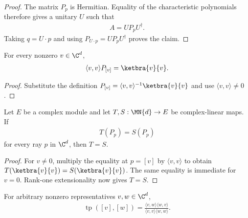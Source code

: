 \begin{proof}\leanok
    The matrix $P_p$ is Hermitian. Equality of the characteristic polynomials
    therefore gives a unitary $U$ such that
    \begin{align}
        A=UP_pU^\dagger.
    \end{align}
    Taking $q=U\cdot p$ and using $P_{U\cdot p}=UP_pU^\dagger$ proves the
    claim.
\end{proof}

\begin{theorem}
    \label{thm:star_dot_self_smul_normalized_pure_state_matrix}
    \leanok
    For every nonzero $v\in\C^d$,
    \begin{align}
        \langle v,v\rangle P_{[v]}=\ketbra{v}{v}.
    \end{align}
\end{theorem}

\begin{proof}\leanok
    Substitute the definition
    $P_{[v]}=\langle v,v\rangle^{-1}\ketbra{v}{v}$ and use
    $\langle v,v\rangle\ne0$.
\end{proof}

\begin{theorem}
    \label{thm:linear_map_eq_of_eq_on_pure_state_matrix}
    \leanok
    Let $E$ be a complex module and let $T,S:\MN{d}\to E$ be
    complex-linear maps. If
    \begin{align}
        T(P_p)=S(P_p)
    \end{align}
    for every ray $p$ in $\C^d$, then $T=S$.
\end{theorem}

\begin{proof}\leanok
    For $v\ne0$, multiply the equality at $p=[v]$ by
    $\langle v,v\rangle$ to obtain
    $T(\ketbra{v}{v})=S(\ketbra{v}{v})$. The same equality is immediate for
    $v=0$. Rank-one extensionality now gives $T=S$.
\end{proof}

\begin{theorem}
    \label{thm:projective_transition_probability_mk}
    \leanok
    For arbitrary nonzero representatives $v,w\in\C^d$,
    \begin{align}
        \operatorname{tp}([v],[w])
        =\frac{\langle v,w\rangle\langle w,v\rangle}
        {\langle v,v\rangle\langle w,w\rangle}.
    \end{align}
\end{theorem}

